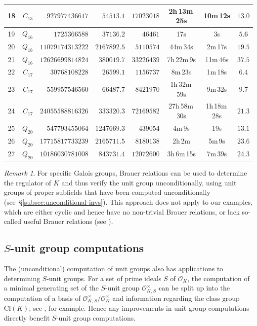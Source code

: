 \documentclass[12pt, a4paper, usenames]{amsart}
\theoremstyle{plain}
\theoremstyle{remark}
\newtheorem{remark}[theorem]{Remark}
\theoremstyle{definition}
\newcommand{\Cl}{\mathrm{Cl}}
\begin{document}
\begin{table}[ht!]
\begin{tabular}{crrrrccc}
18 & $C_{13}$ & $927977436617$  & $54513.1$  & $17023018$  & 2h\,13m\,25s & 10m\,12s & $13.0$ \\
\midrule
19 & $Q_{16}$ & $1725366588$  & $37136.2$  & $46461$  & 17s & 3s & $5.6$ \\
20 & $Q_{16}$ & $11079174313222$  & $2167892.5$  & $5110574$  & 44m\,34s & 2m\,17s & $19.5$ \\
21 & $Q_{16}$ & $12626699814824$  & $380019.7$  & $33226439$  & 7h\,22m\,9s & 11m\,46s & $37.5$ \\
\midrule
22 & $C_{17}$ & $30768108228$  & $26599.1$  & $1156737$  & 8m\,23s & 1m\,18s & $6.4$ \\
23 & $C_{17}$ & $559957546560$  & $66487.7$  & $8421970$  & 1h\,32m\,59s & 9m\,32s & $9.7$ \\
24 & $C_{17}$ & $24055588816326$  & $333320.3$  & $72169582$  & 27h\,58m\,30s & 1h\,18m\,28s & $21.3$ \\
\midrule
25 & $Q_{20}$ & $547793455064$  & $1247669.3$  & $439054$  & 4m\,9s & 19s & $13.1$ \\
26 & $Q_{20}$ & $17715817733239$  & $2165711.5$  & $8180138$  & 2h\,2m & 5m\,9s & $23.6$ \\
27 & $Q_{20}$ & $10186030781008$  & $843731.4$  & $12072600$  & 3h\,6m\,15s & 7m\,39s & $24.3$ \\
\bottomrule 
\end{tabular}
\end{table}


\begin{remark}
For specific Galois groups, Brauer relations can be used to determine the regulator of $K$ 
and thus verify the unit group unconditionally, using unit groups of proper 
subfields that have been computed unconditionally 
(see~\S\ref{subsec:unconditional-invs}). This approach does not apply to our 
examples, which are either cyclic and hence have no non-trivial Brauer relations, 
or lack so-called useful Brauer relations (see \cite[Theorem~2.9]{MR4440537}).
\end{remark}


\subsection{$S$-unit group computations}\label{subsec:extend-to-S-units}
The (unconditional) computation of unit groups also has applications to determining 
$S$-unit groups.
For a set of prime ideals $S$ of $\mathcal{O}_{K}$, 
the computation of a minimal generating set of the $S$-unit group
$\mathcal{O}_{K, S}^{\times}$ can be split up into the computation of a basis of $\mathcal{O}_{K, S}^{\times}/\mathcal{O}_{K}^{\times}$ 
and information regarding the class group $\Cl(K)$; 
see \cite[Algorithm~6.1]{MR1898758}, for example.
Hence any improvements in unit group computations directly benefit $S$-unit group computations.
\end{document}
